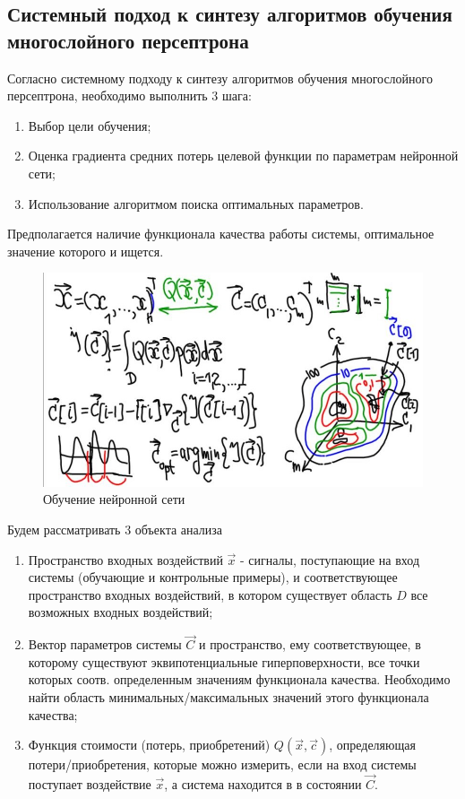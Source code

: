 \documentclass{article}
\numberwithin{equation}{subsection}
\begin{document}
\subsection{Системный подход к синтезу алгоритмов обучения многослойного персептрона}

Согласно системному подходу к синтезу алгоритмов обучения многослойного персептрона, 
необходимо выполнить 3 шага:
\begin{enumerate}
    \item Выбор цели обучения;
    \item Оценка градиента средних потерь целевой функции по параметрам нейронной сети;
    \item Использование алгоритмом поиска оптимальных параметров.
\end{enumerate}

Предполагается наличие функционала качества работы системы, оптимальное значение 
которого и ищется.

\begin{figure}[htbp]
    \centering
    \includegraphics[height=8 cm]{hyperflat_4_1.jpeg}
    \caption{Обучение нейронной сети}
    \label{hyperflat_4_1}
\end{figure}

Будем рассматривать 3 объекта анализа
\begin{enumerate}
    \item Пространство входных воздействий $\vec{x}$ - сигналы, поступающие на вход системы 
    (обучающие и контрольные примеры), и соответствующее пространство входных воздействий, 
    в котором существует область $D$ все возможных входных воздействий;
    \item Вектор параметров системы $\vec{C}$ и пространство, ему соответствующее, 
    в которому существуют эквипотенциальные гиперповерхности, все точки которых 
    соотв. определенным значениям функционала качества. Необходимо найти 
    область минимальных/максимальных значений этого функционала качества;
    \item Функция стоимости (потерь, приобретений) $Q(\vec{x}, \vec{c})$, 
    определяющая потери/приобретения, которые можно измерить, если на вход 
    системы поступает воздействие $\vec{x}$, а система находится в в состоянии $\vec{C}$.
\end{enumerate}
\end{document}
